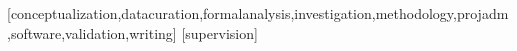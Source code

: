 \documentclass{textolivre}
\begin{document}
\begin{contributors}
[conceptualization,datacuration,formalanalysis,investigation,methodology,projadm,software,validation,writing]
[supervision]
\end{contributors}
\end{document}

